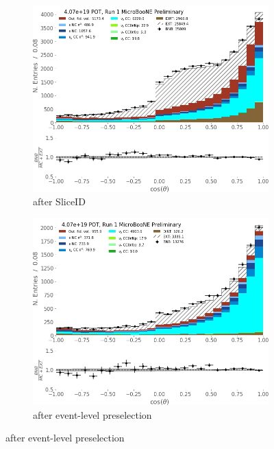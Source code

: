 \begin{figure}[H] 
\begin{center}
    \begin{subfigure}[b]{0.3\textwidth}
    \centering
    \includegraphics[width=1.00\textwidth]{NuMuCCsel/Images/Ryan/Run1_costheta_SliceID.jpg}
    \caption{\label{fig:NuMUCCsel:ryan:trklenSliceID} after SliceID}
    \end{subfigure}
    \begin{subfigure}[b]{0.3\textwidth}
    \centering
    \includegraphics[width=1.00\textwidth]{NuMuCCsel/Images/Ryan/Run1_costheta_EvtSel.jpg}
    \caption{\label{fig:NuMUCCsel:ryan:trklenEvt} after event-level preselection}

\end{subfigure}
\end{center}
\end{figure}
